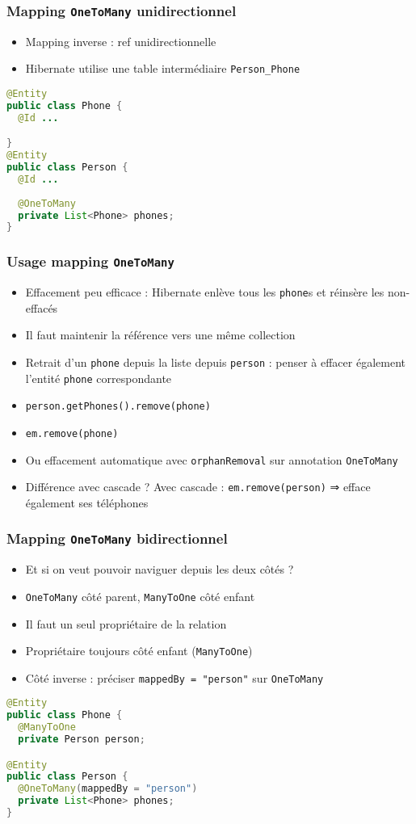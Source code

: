 \documentclass[english, french]{beamer}
\begin{document}
\begin{frame}[fragile]
	\frametitle{Mapping \texttt{OneToMany} unidirectionnel}
	\begin{itemize}
		\item Mapping inverse : ref  unidirectionnelle
		\item Hibernate utilise une table intermédiaire \texttt{Person\_Phone}%
	\end{itemize}
	\begin{lstlisting}[language=Java]
@Entity
public class Phone {
  @Id ...

}
@Entity
public class Person {
  @Id ...
  
  @OneToMany
  private List<Phone> phones;
}
	\end{lstlisting}
\end{frame}

\begin{frame}
	\frametitle{Usage mapping \texttt{OneToMany}}
	\begin{itemize}
		\item Effacement peu efficace : Hibernate enlève tous les \texttt{phone}s et réinsère les non-effacés
		\item Il faut maintenir la référence vers une même collection%
		\item Retrait d’un \texttt{phone} depuis la liste depuis \texttt{person} : penser à effacer également l’entité \texttt{phone} correspondante
		\item \texttt{person.getPhones().remove(phone)}
		\item \texttt{em.remove(phone)}
		\item Ou effacement automatique avec \texttt{orphanRemoval} sur annotation \texttt{OneToMany}
		\item Différence avec cascade ? \pause Avec cascade : \texttt{em.remove(person)} ⇒ efface également ses téléphones
	\end{itemize}
\end{frame}

\begin{frame}[fragile]
	\frametitle{Mapping \texttt{OneToMany} bidirectionnel}
	\begin{itemize}
		\item Et si on veut pouvoir naviguer depuis les deux côtés ?
		\item \texttt{OneToMany} côté parent, \texttt{ManyToOne} côté enfant
		\item Il faut un seul propriétaire de la relation
		\item Propriétaire toujours côté enfant (\texttt{ManyToOne})
		\item Côté inverse : préciser \texttt{mappedBy = "person"} sur \texttt{OneToMany}
	\end{itemize}
	\begin{lstlisting}[language=Java]
@Entity
public class Phone {
  @ManyToOne
  private Person person;

@Entity
public class Person {
  @OneToMany(mappedBy = "person")
  private List<Phone> phones;
}
\end{lstlisting}
\end{frame}
\end{document}

